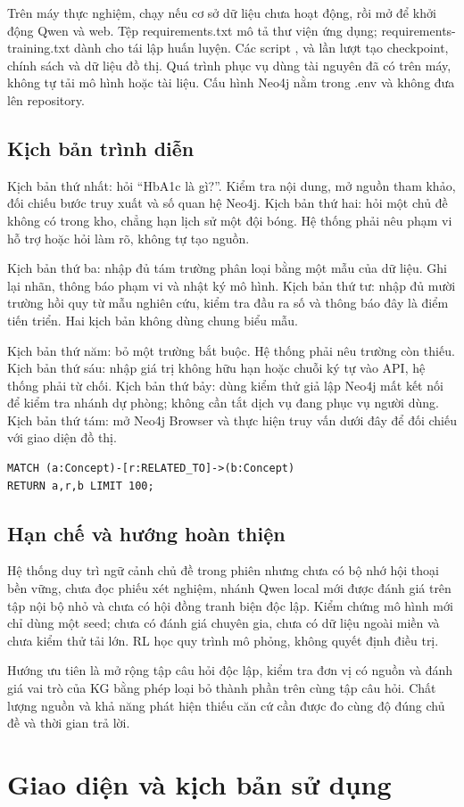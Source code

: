 Trên máy thực nghiệm, chạy  nếu cơ sở dữ liệu chưa hoạt động, rồi mở  để khởi động Qwen và web. Tệp requirements.txt mô tả thư viện ứng dụng; requirements-training.txt dành cho tái lập huấn luyện. Các script ,  và  lần lượt tạo checkpoint, chính sách và dữ liệu đồ thị. Quá trình phục vụ dùng tài nguyên đã có trên máy, không tự tải mô hình hoặc tài liệu. Cấu hình Neo4j nằm trong .env và không đưa lên repository.
\section{Kịch bản trình diễn}
Kịch bản thứ nhất: hỏi ``HbA1c là gì?''. Kiểm tra nội dung, mở nguồn tham khảo, đối chiếu bước truy xuất và số quan hệ Neo4j. Kịch bản thứ hai: hỏi một chủ đề không có trong kho, chẳng hạn lịch sử một đội bóng. Hệ thống phải nêu phạm vi hỗ trợ hoặc hỏi làm rõ, không tự tạo nguồn.

Kịch bản thứ ba: nhập đủ tám trường phân loại bằng một mẫu của dữ liệu. Ghi lại nhãn, thông báo phạm vi và nhật ký mô hình. Kịch bản thứ tư: nhập đủ mười trường hồi quy từ mẫu nghiên cứu, kiểm tra đầu ra số và thông báo đây là điểm tiến triển. Hai kịch bản không dùng chung biểu mẫu.

Kịch bản thứ năm: bỏ một trường bắt buộc. Hệ thống phải nêu trường còn thiếu. Kịch bản thứ sáu: nhập giá trị không hữu hạn hoặc chuỗi ký tự vào API, hệ thống phải từ chối. Kịch bản thứ bảy: dùng kiểm thử giả lập Neo4j mất kết nối để kiểm tra nhánh dự phòng; không cần tắt dịch vụ đang phục vụ người dùng. Kịch bản thứ tám: mở Neo4j Browser và thực hiện truy vấn dưới đây để đối chiếu với giao diện đồ thị.
\begin{verbatim}
MATCH (a:Concept)-[r:RELATED_TO]->(b:Concept)
RETURN a,r,b LIMIT 100;
\end{verbatim}
\section{Hạn chế và hướng hoàn thiện}
Hệ thống duy trì ngữ cảnh chủ đề trong phiên nhưng chưa có bộ nhớ hội thoại bền vững, chưa đọc phiếu xét nghiệm, nhánh Qwen local mới được đánh giá trên tập nội bộ nhỏ và chưa có hội đồng tranh biện độc lập. Kiểm chứng mô hình mới chỉ dùng một seed; chưa có đánh giá chuyên gia, chưa có dữ liệu ngoài miền và chưa kiểm thử tải lớn. RL học quy trình mô phỏng, không quyết định điều trị.

Hướng ưu tiên là mở rộng tập câu hỏi độc lập, kiểm tra đơn vị có nguồn và đánh giá vai trò của KG bằng phép loại bỏ thành phần trên cùng tập câu hỏi. Chất lượng nguồn và khả năng phát hiện thiếu căn cứ cần được đo cùng độ đúng chủ đề và thời gian trả lời.


\chapter{Giao diện và kịch bản sử dụng}

